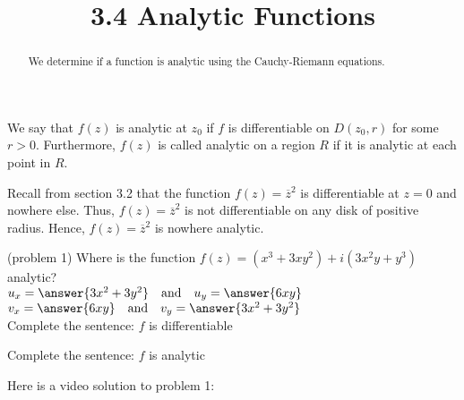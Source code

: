 \documentclass[handout]{ximera}
\title{3.4 Analytic Functions}
\begin{document}
\begin{abstract}
We determine if a function is analytic using the Cauchy-Riemann equations.
\end{abstract}

\maketitle

\begin{definition}
We say that $f(z)$ is analytic at $z_0$ if $f$ is differentiable on $D(z_0, r)$ for some $r>0$.
Furthermore, $f(z)$ is called analytic on a region $R$ if it is analytic at each point in $R$.
\end{definition}


\begin{example}[example 1]
Recall from section 3.2 that the function $f(z) = \overline{z}^2$ is differentiable 
at $z=0$ and nowhere else. Thus,
$f(z) = \overline{z}^2$ is not differentiable on any disk of positive radius. 
Hence, $f(z) = \overline{z}^2$ is nowhere analytic.
\end{example}

\begin{problem}(problem 1)
Where is the function $f(z) = (x^3 + 3xy^2) +i(3x^2y+y^3)$ analytic?\\
$u_x = \answer{3x^2+3y^2} \quad \text{and} \quad u_y = \answer{6xy}$\\
$v_x = \answer{6xy} \quad \text{and} \quad v_y = \answer{3x^2 + 3y^2}$\\
Complete the sentence:  $f$ is differentiable
\begin{multipleChoice}
\end{multipleChoice}
Complete the sentence:  $f$ is analytic
\begin{multipleChoice}
\end{multipleChoice}
\end{problem}

Here is a video solution to problem 1:\\
\begin{foldable}
\end{foldable}
\end{document}
